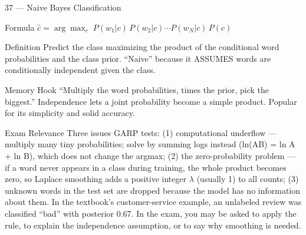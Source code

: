 \documentclass[aspectratio=169,8pt]{beamer}
\begin{document}
	\begin{frame}{37 --- Naive Bayes Classification}
		\begin{block}{Formula}
			$\hat{c} = \arg\max_c\; P(w_1|c)\,P(w_2|c)\cdots P(w_N|c)\,P(c)$
		\end{block}
		\begin{block}{Definition}
			Predict the class maximizing the product of the conditional word probabilities and the class prior. ``Naive'' because it ASSUMES words are conditionally independent given the class.
		\end{block}
		\begin{block}{Memory Hook}
			``Multiply the word probabilities, times the prior, pick the biggest.'' Independence lets a joint probability become a simple product. Popular for its simplicity and solid accuracy.
		\end{block}
		\begin{block}{Exam Relevance}
			Three issues GARP tests: (1) computational underflow --- multiply many tiny probabilities; solve by summing logs instead (ln(AB) = ln A + ln B), which does not change the argmax; (2) the zero-probability problem --- if a word never appears in a class during training, the whole product becomes zero, so Laplace smoothing adds a positive integer $\lambda$ (usually 1) to all counts; (3) unknown words in the test set are dropped because the model has no information about them. In the textbook's customer-service example, an unlabeled review was classified ``bad'' with posterior 0.67. In the exam, you may be asked to apply the rule, to explain the independence assumption, or to say why smoothing is needed.
		\end{block}
	\end{frame}
	
\end{document}
